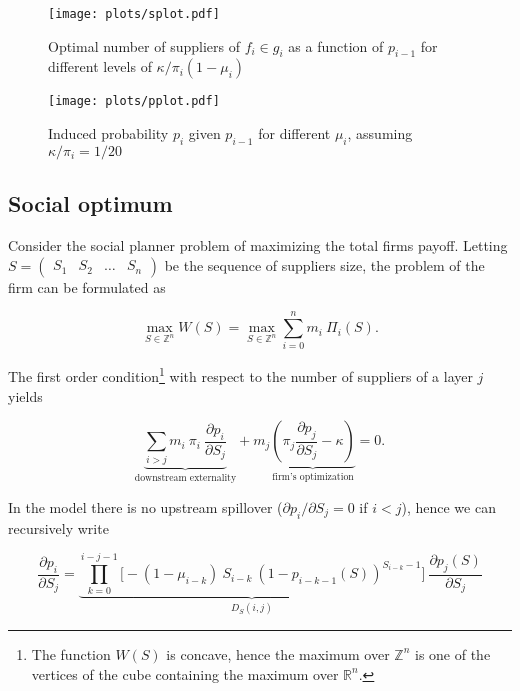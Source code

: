 \documentclass[american, abstract=on]{scrartcl}
\renewcommand{\Re}{\mathbb{R}}
\begin{document}
\begin{figure}[H]
  \centering
  \texttt{[image: plots/splot.pdf]} 
  \caption{Optimal number of suppliers of $f_i \in g_i$ as a function of $p_{i - 1}$ for different levels of $\kappa \Big/ \pi_i (1 - \mu_i)$}
  \label{fig:splot}
\end{figure}

\begin{figure}[H]
  \centering
  \texttt{[image: plots/pplot.pdf]} 
  \caption{Induced probability $p_i$ given $p_{i - 1}$ for different $\mu_i$, assuming $\kappa / \pi_i = 1/20$}
  \label{fig:pplot}
\end{figure}

\subsection{Social optimum}

Consider the social planner problem of maximizing the total firms payoff. Letting $S = \begin{pmatrix} S_1 & S_2 & \ldots & S_n \end{pmatrix}$ be the sequence of suppliers size, the problem of the firm can be formulated as

\begin{equation}
  \max_{S \in \mathbb{Z}^n} W(S) = \max_{S \in \mathbb{Z}^n} \sum^n_{i = 0} m_i \ \Pi_i(S).
\end{equation}

The first order condition\footnote{The function $W(S)$ is concave, hence the maximum over $\mathbb{Z}^n$ is one of the vertices of the cube containing the maximum over $\Re^n$.} with respect to the number of suppliers of a layer $j$ yields

\begin{equation}
  \underbrace{\sum_{i > j} m_i \ \pi_i \ \frac{\partial p_i}{\partial S_j}}_{\text{downstream externality}} + m_j  \underbrace{\left( \pi_j \frac{\partial p_j}{\partial S_j} - \kappa\right)}_{\text{firm's optimization}} = 0.
\end{equation}

In the model there is no upstream spillover ($\partial p_i / \partial S_j = 0$ if $i < j$), hence we can recursively write

\begin{equation}
  \frac{\partial p_i}{\partial S_j} = \underbrace{\prod^{i - j - 1}_{k = 0} \Big[ -(1 - \mu_{i - k}) \ S_{i - k} \ (1 - p_{i - k - 1}(S))^{S_{i - k} - 1} \Big]}_{D_S(i, j)} \ \frac{\partial p_j(S)}{\partial S_j}
\end{equation}
\end{document}
